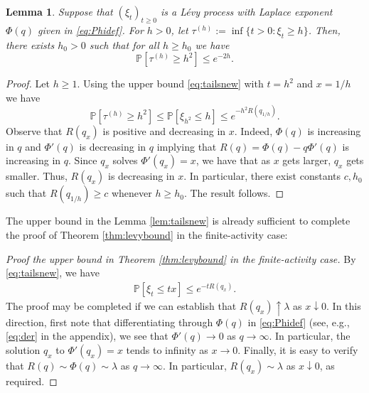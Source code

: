 \documentclass[a4,12pt]{amsart}
\numberwithin{equation}{section}
\newtheorem{lemma}[thm]{Lemma}
\newcommand{\MassP}{\mathcal{P}_{\rm m}}
\begin{document}
	\begin{lemma}\label{lem:bounded}
		Suppose that $(\xi_t)_{t \geq 0}$ is a L\'evy process with 
		Laplace exponent $\Phi(q)$ given in \eqref{eq:Phidef}. 
		For $h > 0$, let $\tau^{(h)}:=\inf\{t>0:\xi_t\geq h\}$. Then, there exists $h_0> 0$ such that for all $h \geq h_0$ we have 
		\begin{equation*}
			\mathbb{P}\left[\tau^{(h)}\geq h^2\right]\leq e^{-2h}.
		\end{equation*}
	\end{lemma}
	\begin{proof}
    		Let $h \geq 1$. Using the upper bound \eqref{eq:tailsnew} with $t = h^2$ and $x = 1/h$ we have
		\begin{equation*}
			\mathbb{P}\left[\tau^{(h)}\geq h^2\right]\leq \mathbb{P}[ \xi_{h^2} \leq h ] \leq e^{-h^2R(q_{1/h})}.
		\end{equation*}
Observe that $R(q_x)$ is positive and decreasing in $x$.  Indeed,  $\Phi(q)$ is increasing in $q$ and $\Phi'(q)$ is decreasing in $q$ implying that $R(q) = \Phi(q) - q \Phi'(q)$ is increasing in $q$. Since  $q_x$ solves $\Phi'(q_x) = x$, we have that as $x$ gets larger, $q_x$ gets smaller.  Thus, $R(q_x)$ is decreasing in $x$.
 In particular, there exist constants $c, h_0$ such that $R(q_{1/h}) \geq c$ whenever $h \geq h_0$. The result follows.
	\end{proof}


The upper bound in the Lemma \ref{lem:tailsnew} is already sufficient to complete the proof of Theorem \ref{thm:levybound} in the finite-activity case:

\begin{proof}[Proof the upper bound in Theorem \ref{thm:levybound} in the finite-activity case]
By \eqref{eq:tailsnew}, we have
\begin{align*}
	\mathbb{P}[ \xi_t \leq tx ] \leq e^{ - tR(q_x)}.
\end{align*}
The proof may be completed if we can establish that $R(q_x) \uparrow \lambda$ as $x \downarrow 0$. 
In this direction, first note that differentiating through $\Phi(q)$ in \eqref{eq:Phidef} (see, e.g., \eqref{eq:der} in the appendix), we see that $\Phi'(q) \to 0$ as $q \to \infty$. 
In particular, the solution $q_x$ to $\Phi'(q_x) = x$ tends to infinity as $x \to 0$. 
Finally, it is easy to verify that $R(q) \sim \Phi(q) \sim \lambda$ as $q\to\infty$. 
In particular, $R(q_x) \sim \lambda$ as $x \downarrow 0$, as required.
\end{proof}
\end{document}
